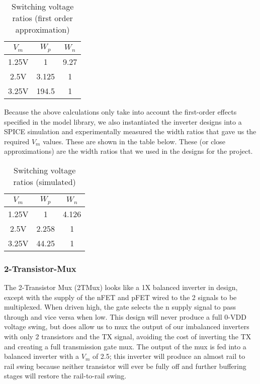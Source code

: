 \documentclass[12pt, letterpaper]{article}
\newcommand{\Vm}{$V_m$ } %
\newcommand{\Wn}{$W_n$ } %
\newcommand{\Wp}{$W_p$ } %
\begin{document}
\begin{table}[htb]
    \centering
    \begin{tabular}{c c c}
        \Vm & \Wp & \Wn \\
        \hline
        1.25V & 1     & 9.27 \\
        2.5V  & 3.125 & 1 \\
        3.25V & 194.5 & 1 \\
        \hline
    \end{tabular}
    \caption{Switching voltage ratios (first order approximation)}
\end{table}

Because the above calculations only take into account the first-order effects specified in the model library, we also instantiated the inverter designs into a SPICE simulation and experimentally measured the width ratios that gave us the required \Vm values.
These are shown in the table below.
These (or close approximations) are the width ratios that we used in the designs for the project.

\begin{table}[htb]
    \centering
    \begin{tabular}{c c c}
        \Vm & \Wp & \Wn \\
        \hline
        1.25V & 1     & 4.126 \\
        2.5V  & 2.258 & 1 \\
        3.25V & 44.25 & 1 \\
        \hline
    \end{tabular}
    \caption{Switching voltage ratios (simulated)}
\end{table}

\subsubsection{2-Transistor-Mux}
The 2-Transistor Mux (2TMux) looks like a 1X balanced inverter in design, except with the supply of the nFET and pFET wired to the 2 signals to be multiplexed.
When driven high, the gate selects the n supply signal to pass through and vice versa when low.
This design will never produce a full 0-VDD voltage swing, but does allow us to mux the output of our imbalanced inverters with only 2 transistors and the TX signal, avoiding the cost of inverting the TX and creating a full transmission gate mux.
The output of the mux is fed into a balanced inverter with a \Vm of 2.5; this inverter will produce an almost rail to rail swing because neither transistor will ever be fully off and further buffering stages will restore the rail-to-rail swing.
\end{document}
